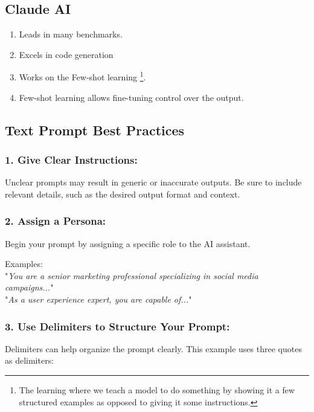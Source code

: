 \subsection*{Claude AI}
\begin{enumerate}
    \item Leads in many benchmarks.
    \item Excels in code generation
    \item Works on the Few-shot learning \footnote{The learning where we teach a model to do something by showing it a few structured examples as opposed to giving it some instructions.}.
    \item Few-shot learning allows fine-tuning control over the output.
\end{enumerate}

\subsection{Text Prompt Best Practices}
\subsubsection*{1. Give Clear Instructions:}
Unclear prompts may result in generic or inaccurate outputs. Be sure to include relevant details, such as the desired output format and context.

\subsubsection*{2. Assign a Persona:}
Begin your prompt by assigning a specific role to the AI assistant.

\vspace{0.25cm}
Examples:\\
"\textit{You are a senior marketing professional specializing in social media campaigns...}"\\
"\textit{As a user experience expert, you are capable of...}"

\subsubsection*{3. Use Delimiters to Structure Your Prompt:}
Delimiters can help organize the prompt clearly. This example uses three quotes as delimiters:

